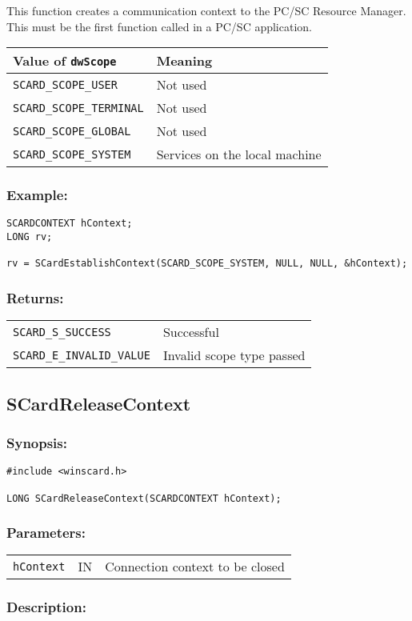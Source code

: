 \documentclass[a4paper,12pt]{article}
\newcommand{\synopsis}{\subsubsection{Synopsis:}}
\newcommand{\parameters}{\subsubsection{Parameters:}}
\newcommand{\desc}{\subsubsection{Description:}}
\newcommand{\example}{\subsubsection{Example:}}
\newcommand{\returns}{\subsubsection{Returns:}}
\begin{document}
This function creates a communication context to the PC/SC Resource
Manager. This must be the first function called in a PC/SC application.

\begin{tabular}{|l|l|}
\hline
Value of \texttt{dwScope} & Meaning\\
\hline
\hline
\texttt{SCARD\_SCOPE\_USER} & Not used\\
\hline
\texttt{SCARD\_SCOPE\_TERMINAL} & Not used\\
\hline
\texttt{SCARD\_SCOPE\_GLOBAL} & Not used\\
\hline
\texttt{SCARD\_SCOPE\_SYSTEM} & Services on the local machine\\
\hline
\end{tabular}


\example
\begin{verbatim}
SCARDCONTEXT hContext;
LONG rv;

rv = SCardEstablishContext(SCARD_SCOPE_SYSTEM, NULL, NULL, &hContext);
\end{verbatim}

\returns

\begin{tabular}{ll}
\texttt{SCARD\_S\_SUCCESS} & Successful\\
\texttt{SCARD\_E\_INVALID\_VALUE} & Invalid scope type passed
\end{tabular}


\subsection{SCardReleaseContext}

\synopsis
\begin{verbatim}
#include <winscard.h>

LONG SCardReleaseContext(SCARDCONTEXT hContext);
\end{verbatim}

\parameters

\begin{tabular}{lll}
\texttt{hContext} & IN & Connection context to be closed
\end{tabular}

\desc
\end{document}
